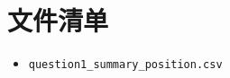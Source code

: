 \documentclass{ctexart}
\begin{document}
\appendix

\section{文件清单}

\begin{itemize}
    \item[] \texttt{question1\_summary\_position.csv}
\end{itemize}



\end{document}
